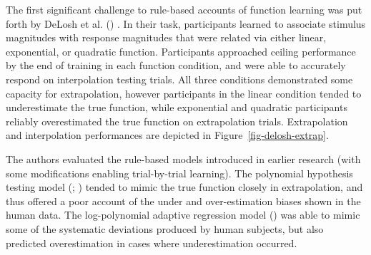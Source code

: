 \documentclass[
  11pt,
  letterpaper,
]{article}
\begin{document}
The first significant challenge to rule-based accounts of function
learning was put forth by DeLosh et al.
() . In their task,
participants learned to associate stimulus magnitudes with response
magnitudes that were related via either linear, exponential, or
quadratic function. Participants approached ceiling performance by the
end of training in each function condition, and were able to accurately
respond on interpolation testing trials. All three conditions
demonstrated some capacity for extrapolation, however participants in
the linear condition tended to underestimate the true function, while
exponential and quadratic participants reliably overestimated the true
function on extrapolation trials. Extrapolation and interpolation
performances are depicted in Figure~\ref{fig-delosh-extrap}.

The authors evaluated the rule-based models introduced in earlier
research (with some modifications enabling trial-by-trial learning). The
polynomial hypothesis testing model
(;
)
tended to mimic the true function closely in extrapolation, and thus
offered a poor account of the under and over-estimation biases shown in
the human data. The log-polynomial adaptive regression model
()
was able to mimic some of the systematic deviations produced by human
subjects, but also predicted overestimation in cases where
underestimation occurred.
\end{document}
